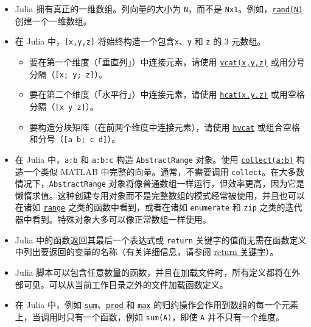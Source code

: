 \begin{itemize}
\item Julia 拥有真正的一维数组。列向量的大小为 \texttt{N}，而不是 \texttt{Nx1}。例如，\hyperlink{7668863842145012694}{\texttt{rand(N)}} 创建一个一维数组。


\item 在 Julia 中，\texttt{[x,y,z]} 将始终构造一个包含\texttt{x}、\texttt{y} 和 \texttt{z} 的 3 元数组。

\begin{itemize}
\item 要在第一个维度（「垂直列」）中连接元素，请使用 \hyperlink{14691815416955507876}{\texttt{vcat(x,y,z)}} 或用分号分隔（\texttt{[x; y; z]}）。


\item 要在第二个维度（「水平行」）中连接元素，请使用 \hyperlink{8862791894748483563}{\texttt{hcat(x,y,z)}} 或用空格分隔（\texttt{[x y z]}）。


\item 要构造分块矩阵（在前两个维度中连接元素），请使用 \hyperlink{16279083053557795116}{\texttt{hvcat}} 或组合空格和分号（\texttt{[a b; c d]}）。

\end{itemize}

\item 在 Julia 中，\texttt{a:b} 和 \texttt{a:b:c} 构造 \texttt{AbstractRange} 对象。使用 \hyperlink{6278865767444641812}{\texttt{collect(a:b)}} 构造一个类似 MATLAB 中完整的向量。通常，不需要调用 \texttt{collect}。在大多数情况下，\texttt{AbstractRange} 对象将像普通数组一样运行，但效率更高，因为它是懒惰求值。这种创建专用对象而不是完整数组的模式经常被使用，并且也可以在诸如 \hyperlink{737600656772861535}{\texttt{range}} 之类的函数中看到，或者在诸如 \texttt{enumerate} 和 \texttt{zip} 之类的迭代器中看到。特殊对象大多可以像正常数组一样使用。


\item Julia 中的函数返回其最后一个表达式或 \texttt{return} 关键字的值而无需在函数定义中列出要返回的变量的名称（有关详细信息，请参阅 \hyperlink{16317991580998959177}{return 关键字}）。


\item Julia 脚本可以包含任意数量的函数，并且在加载文件时，所有定义都将在外部可见。可以从当前工作目录之外的文件加载函数定义。


\item 在 Julia 中，例如 \hyperlink{8666686648688281595}{\texttt{sum}}、\hyperlink{13484084847910116333}{\texttt{prod}} 和 \hyperlink{7839419811914289844}{\texttt{max}} 的归约操作会作用到数组的每一个元素上，当调用时只有一个函数，例如 \texttt{sum(A)}，即使 \texttt{A} 并不只有一个维度。



\end{itemize}
